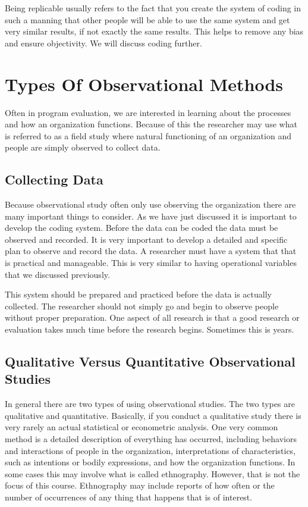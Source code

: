 \documentclass[]{book}
\theoremstyle{definition}
\theoremstyle{definition}
\theoremstyle{definition}
\theoremstyle{remark}
\begin{document}
Being replicable usually refers to the fact that you create the system
of coding in such a manning that other people will be able to use the
same system and get very similar results, if not exactly the same
results. This helps to remove any bias and ensure objectivity. We will
discuss coding further.

\hypertarget{types-of-observational-methods}{%
\section{Types Of Observational
Methods}\label{types-of-observational-methods}}

Often in program evaluation, we are interested in learning about the
processes and how an organization functions. Because of this the
researcher may use what is referred to as a field study where natural
functioning of an organization and people are simply observed to collect
data.

\hypertarget{collecting-data}{%
\subsection{Collecting Data}\label{collecting-data}}

Because observational study often only use observing the organization
there are many important things to consider. As we have just discussed
it is important to develop the coding system. Before the data can be
coded the data must be observed and recorded. It is very important to
develop a detailed and specific plan to observe and record the data. A
researcher must have a system that that is practical and manageable.
This is very similar to having operational variables that we discussed
previously.

This system should be prepared and practiced before the data is actually
collected. The researcher should not simply go and begin to observe
people without proper preparation. One aspect of all research is that a
good research or evaluation takes much time before the research begins.
Sometimes this is years.

\hypertarget{qualitative-versus-quantitative-observational-studies}{%
\subsection{Qualitative Versus Quantitative Observational
Studies}\label{qualitative-versus-quantitative-observational-studies}}

In general there are two types of using observational studies. The two
types are qualitative and quantitative. Basically, if you conduct a
qualitative study there is very rarely an actual statistical or
econometric analysis. One very common method is a detailed description
of everything has occurred, including behaviors and interactions of
people in the organization, interpretations of characteristics, such as
intentions or bodily expressions, and how the organization functions. In
some cases this may involve what is called ethnography. However, that is
not the focus of this course. Ethnography may include reports of how
often or the number of occurrences of any thing that happens that is of
interest.
\end{document}
